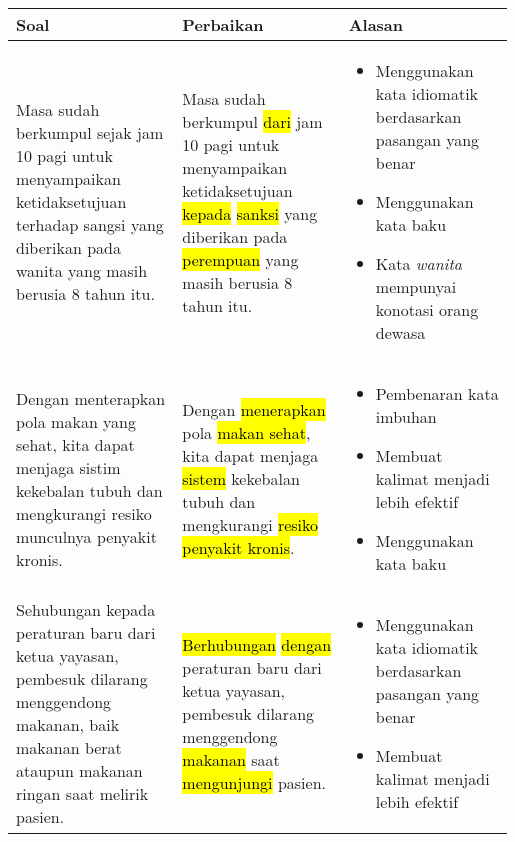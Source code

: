 \documentclass[
	10pt, %
	indonesian
]{assignment}
\begin{document}
\begin{center}
	\begin{longtable}{ p{0.33\linewidth} | p{0.33\linewidth} | p{0.33\linewidth}}
		Soal & Perbaikan & Alasan                                       \\
		\toprule

		Masa sudah berkumpul sejak jam 10 pagi untuk menyampaikan ketidaksetujuan
		terhadap sangsi yang diberikan pada wanita yang masih berusia 8 tahun itu.
		     &
		Masa sudah berkumpul \hl{dari} jam 10 pagi untuk menyampaikan ketidaksetujuan
		\hl{kepada} \hl{sanksi} yang diberikan pada \hl{perempuan} yang masih berusia 8 tahun itu.
		     &
		\begin{itemize}
			\item Menggunakan kata idiomatik berdasarkan pasangan yang benar
			\item Menggunakan kata baku
			\item Kata \textit{wanita} mempunyai konotasi orang dewasa
		\end{itemize} \\

		\midrule

		Dengan menterapkan pola makan yang sehat, kita dapat menjaga sistim
		kekebalan tubuh dan mengkurangi resiko munculnya penyakit kronis.
		     &
		Dengan \hl{menerapkan} pola \hl{makan sehat}, kita dapat menjaga \hl{sistem}
		kekebalan tubuh dan mengkurangi \hl{resiko penyakit kronis}.
		     &
		\begin{itemize}
			\item Pembenaran kata imbuhan
			\item Membuat kalimat menjadi lebih efektif
			\item Menggunakan kata baku
		\end{itemize}                      \\

		\midrule

		Sehubungan kepada peraturan baru dari ketua yayasan, pembesuk dilarang
		menggendong makanan, baik makanan berat ataupun makanan ringan saat
		melirik pasien.
		     &
		\hl{Berhubungan} \hl{dengan} peraturan baru dari ketua yayasan, pembesuk dilarang
		menggendong \hl{makanan} saat \hl{mengunjungi} pasien.
		     &
		\begin{itemize}
			\item Menggunakan kata idiomatik berdasarkan pasangan yang benar
			\item Membuat kalimat menjadi lebih efektif
		\end{itemize} \\


\end{longtable}
\end{center}
\end{document}
